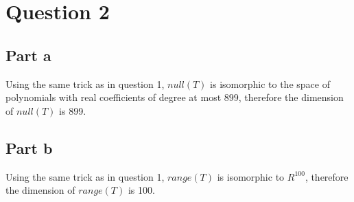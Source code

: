 \section*{Question 2}
\subsection*{Part a}
Using the same trick as in question 1, $ null(T) $ is isomorphic to the space of polynomials with real coefficients of degree at most $ 899 $, therefore the dimension of $ null(T) $ is 899. 

\subsection*{Part b}

Using the same trick as in question 1, $ range(T) $ is isomorphic to $ R^{100} $, therefore the dimension of $ range(T) $ is 100.